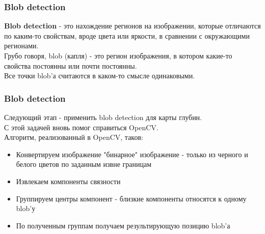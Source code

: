 \documentclass{beamer}
\begin{document}
		\begin{frame}
			\frametitle{Blob detection}
			
			\textbf{Blob detection} - это нахождение регионов на изображении,
			которые отличаются по каким-то свойствам, вроде цвета
			или яркости, в сравнении с окружающими регионами.\\
			Грубо говоря, blob (капля) - это регион изображения,
			в котором какие-то свойства постоянны или почти
			постоянны.\\
			Все точки blob'а считаются в каком-то смысле
			одинаковыми.\\
			
		\end{frame}
		
		\begin{frame}
			\frametitle{Blob detection}
			
			Следующий этап - применить blob detection для карты глубин.\\
			С этой задачей вновь помог справиться OpenCV.\\
			Алгоритм, реализованный в OpenCV, таков:\\
			\begin{itemize}
				\item Конвертируем изображение "бинарное" изображение - только
					  из черного и белого цветов по заданным извне границам
				\item Извлекаем компоненты связности
				\item Группируем центры компонент - близкие компоненты относятся к одному blob'у
				\item По полученным группам получаем результирующую позицию blob'а
			\end{itemize}
			
		\end{frame}
\end{document}
